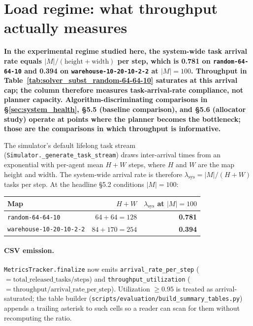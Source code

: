 %

\section{Load regime: what throughput actually measures}
\label{sec:load_regime}

\noindent\textbf{In the experimental regime studied here, the
system-wide task arrival rate equals $|M|/(\text{height} +
\text{width})$ per step, which is 0.781 on
\texttt{random-64-64-10} and 0.394 on
\texttt{warehouse-10-20-10-2-2} at $|M|=100$. Throughput in
Table~\ref{tab:solver_subst_random-64-64-10} saturates at this
arrival cap; the column therefore measures task-arrival-rate
compliance, not planner capacity. Algorithm-discriminating
comparisons in \S\ref{sec:system_health}, \S5.5 (baseline
comparison), and \S5.6 (allocator study) operate at points where
the planner becomes the bottleneck; those are the comparisons in
which throughput is informative.}

\medskip

The simulator's default lifelong task stream
(\texttt{Simulator.\_generate\_task\_stream}) draws inter-arrival
times from an exponential with per-agent mean $H + W$ steps, where
$H$ and $W$ are the map height and width.  The system-wide arrival
rate is therefore $\lambda_{\text{sys}} = |M|/(H+W)$ tasks per
step.  At the headline §5.2 conditions $|M|=100$:

\begin{center}
\small
\begin{tabular}{lrr}
\toprule
Map & $H + W$ & $\lambda_{\text{sys}}$ at $|M|=100$ \\
\midrule
\texttt{random-64-64-10}        & $64 + 64 = 128$  & \textbf{0.781} \\
\texttt{warehouse-10-20-10-2-2} & $84 + 170 = 254$ & \textbf{0.394} \\
\bottomrule
\end{tabular}
\end{center}

\paragraph{CSV emission.}
\texttt{MetricsTracker.finalize} now emits
\texttt{arrival\_rate\_per\_step}
($= \text{total\_released\_tasks}/\text{steps}$) and
\texttt{throughput\_utilization}
($= \text{throughput}/\text{arrival\_rate\_per\_step}$).  Utilization
$\ge 0.95$ is treated as arrival-saturated; the table builder
(\texttt{scripts/evaluation/build\_summary\_tables.py}) appends a
trailing asterisk to such cells so a reader can scan for them
without recomputing the ratio.

